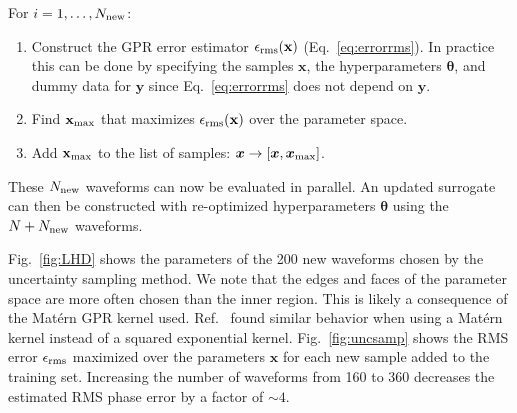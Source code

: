 \documentclass[prd,aps,letter,twocolumn,floatfix,notitlepage,nofootinbib]{revtex4-1}
\def\bx{\mathbf{x}}
\def\by{\mathbf{y}}
\def\btheta{\boldsymbol{\theta}}
\begin{document}


For $i = 1, \dots, N_{\rm new}$:
\begin{enumerate}

\item Construct the GPR error estimator $\epsilon_{\rm rms}(\bx)$ (Eq.~\eqref{eq:errorrms}). In practice this can be done by specifying the samples $\bx$, the hyperparameters $\btheta$, and dummy data for $\by$ since Eq.~\eqref{eq:errorrms} does not depend on $\by$.

\item Find $\bx_{\rm max}$ that maximizes $\epsilon_{\rm rms}(\bx)$ over the parameter space. 

\item Add $\bx_{\rm max}$ to the list of samples: ${\bm x} \to [{\bm x}, {\bm x}_{\rm max}]$.

\end{enumerate}
These $N_{\rm new}$ waveforms can now be evaluated in parallel. An updated surrogate can then be constructed with re-optimized hyperparameters $\btheta$ using the $N + N_{\rm new}$ waveforms.

Fig.~\ref{fig:LHD} shows the parameters of the 200 new waveforms chosen by the uncertainty sampling method. We note that the edges and faces of the parameter space are more often chosen than the inner region. This is likely a consequence of the Mat\'{e}rn GPR kernel used. Ref.~\cite{DoctorFarrHolz2017} found similar behavior when using a Mat\'{e}rn kernel instead of a squared exponential kernel. Fig.~\ref{fig:uncsamp} shows the RMS error $\epsilon_{\rm rms}$ maximized over the parameters $\bx$ for each new sample added to the training set. Increasing the number of waveforms from 160 to 360 decreases the estimated RMS phase error by a factor of $\sim 4$.
\end{document}
